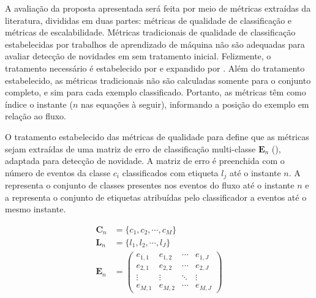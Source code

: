 
A avaliação da proposta apresentada será feita por meio de métricas extraídas da
literatura, divididas em duas partes: métricas de qualidade de classificação
e métricas de escalabilidade.
Métricas tradicionais de qualidade de classificação estabelecidas por trabalhos
de aprendizado de máquina não são adequadas para avaliar detecção de novidades em
\streams sem tratamento inicial. Felizmente, o tratamento necessário é
estabelecido por  e expandido por
.
Além do tratamento estabelecido, as métricas tradicionais não são calculadas
somente para o conjunto completo, e sim para cada exemplo classificado.
Portanto, as métricas têm como índice o instante ($n$ nas equações à seguir),
informando a posição do exemplo em relação ao fluxo.

O tratamento estabelecido das métricas de qualidade para \streamMining define
que as métricas sejam extraídas de uma matriz de erro de classificação
multi-classe $\mathbf{E}_n$ (), adaptada para detecção de
novidade.
A matriz de erro é preenchida com o número de eventos da classe $c_i$ classificados com
etiqueta $l_j$ até o instante $n$.
A  representa o conjunto de classes presentes nos eventos
do fluxo até o instante $n$ e a  representa o conjunto
de etiquetas atribuídas pelo classificador a eventos até o mesmo instante.

\begin{align}
  \mathbf{C}_n &= \{ c_1, c_2, \cdots, c_M \}  \label{eq:classes} \\
  \mathbf{L}_n &= \{ l_1, l_2, \cdots, l_J \}  \label{eq:labels} \\
  \mathbf{E}_n &= \begin{pmatrix}
    e_{1,1} & e_{1,2} & \cdots & e_{1,J} \\
    e_{2,1} & e_{2,2} & \cdots & e_{2,J} \\
    \vdots  & \vdots  & \ddots & \vdots  \\
    e_{M,1} & e_{M,2} & \cdots & e_{M,J} 
  \end{pmatrix}  \label{eq:matrix}
\end{align}


